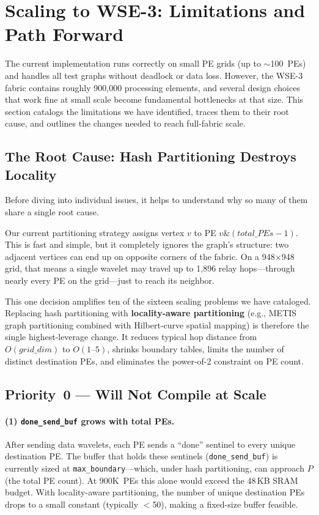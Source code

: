 \documentclass[11pt,letterpaper]{article}
\begin{document}
\section{Scaling to WSE-3: Limitations and Path Forward}
\label{sec:scaling}

The current implementation runs correctly on small PE grids (up to $\sim$100~PEs)
and handles all test graphs without deadlock or data loss.
However, the WSE-3 fabric contains roughly 900{,}000 processing elements,
and several design choices that work fine at small scale
become fundamental bottlenecks at that size.
This section catalogs the limitations we have identified,
traces them to their root cause,
and outlines the changes needed to reach full-fabric scale.

\subsection{The Root Cause: Hash Partitioning Destroys Locality}

Before diving into individual issues, it helps to understand
why so many of them share a single root cause.

Our current partitioning strategy assigns vertex $v$ to PE
$v \mathbin{\&} (\mathit{total\_PEs}-1)$.
This is fast and simple, but it completely ignores the graph's structure:
two adjacent vertices can end up on opposite corners of the fabric.
On a 948$\times$948 grid, that means a single wavelet may travel
up to 1{,}896 relay hops---through nearly every PE on the grid---just
to reach its neighbor.

This one decision amplifies ten of the sixteen scaling problems we have cataloged.
Replacing hash partitioning with \textbf{locality-aware partitioning}
(e.g., METIS graph partitioning combined with Hilbert-curve spatial mapping)
is therefore the single highest-leverage change.
It reduces typical hop distance from $O(\mathit{grid\_dim})$ to $O(1\text{--}5)$,
shrinks boundary tables, limits the number of distinct destination PEs,
and eliminates the power-of-2 constraint on PE count.

\subsection{Priority~0 --- Will Not Compile at Scale}

\paragraph{(1) \texttt{done\_send\_buf} grows with total PEs.}
After sending data wavelets, each PE sends a ``done'' sentinel
to every unique destination PE.
The buffer that holds these sentinels (\texttt{done\_send\_buf})
is currently sized at \texttt{max\_boundary}---which, under hash partitioning,
can approach $P$ (the total PE count).
At 900K~PEs this alone would exceed the 48\,KB SRAM budget.
With locality-aware partitioning, the number of unique destination PEs
drops to a small constant (typically $<$50), making a fixed-size buffer feasible.
\end{document}
